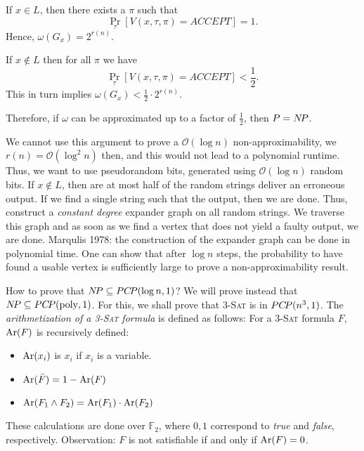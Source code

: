 \documentclass[../skript.tex]{subfiles}
\begin{document}
If $x \in L$, then there exists a $\pi$ such that
\[
	\Pr_{\tau} \left[ V(x, \tau, \pi) = \textit{ACCEPT} \right] = 1.
\]
Hence, $\omega(G_x) = 2^{r(n)}$.

If $x \notin L$ then for all $\pi$ we have
\[
	\Pr_{\tau} \left[ V(x, \tau, \pi) = \textit{ACCEPT} \right] < \frac{1}{2}.
\]
This in turn implies $\omega(G_x) < \frac{1}{2} \cdot 2^{r(n)}$.

Therefore, if $\omega$ can be approximated up to a factor of $\frac{1}{2}$, then $P = N \! P$.

We cannot use this argument to prove a $\mathcal{O}(\log n)$ non-approximability, we $r(n) = \mathcal{O}(\log^2 n)$ then, and this would not lead to a polynomial runtime.
Thus, we want to use pseudorandom bits, generated using $\mathcal{O}(\log n)$ random bits.
If $x \notin L$, then are at most half of the random strings deliver an erroneous output. If we find a single string such that the output, then we are done.
Thus, construct a \emph{constant degree} expander graph on all random strings. We traverse this graph and as soon as we find a vertex that does not yield a faulty output, we are done.
Marqulis \lbrack{}1978\rbrack{}: the construction of the expander graph can be done in polynomial time. One can show that after $\log n$ steps, the probability to have found a usable vertex is sufficiently large to prove a non-approximability result.

How to prove that $N \! P \subseteq PC \! P(\log n, 1)$? We will prove instead that $N \! P \subseteq PC \! P(\operatorname{poly}, 1)$. For this, we shall prove that \textsc{3-Sat} is in $PC \! P(n^3, 1)$.
The \emph{arithmetization of a \textsc{3-Sat} formula} is defined as follows: For a \textsc{3-Sat} formula $F$, $\operatorname{Ar}(F)$ is recursively defined:
\begin{itemize}
\item $\operatorname{Ar}(x_i)$ is $x_i$ if $x_i$ is a variable.
\item $\operatorname{Ar}(\bar{F}) = 1 - \operatorname{Ar}(F)$
\item $\operatorname{Ar}(F_1 \wedge F_2) = \operatorname{Ar}(F_1) \cdot \operatorname{Ar}(F_2)$
\end{itemize}
These calculations are done over $\mathbb{F}_2$, where $0, 1$ correspond to \textit{true} and \textit{false}, respectively.
Observation: $F$ is not satisfiable if and only if $\operatorname{Ar}(F) = 0$.
\end{document}
